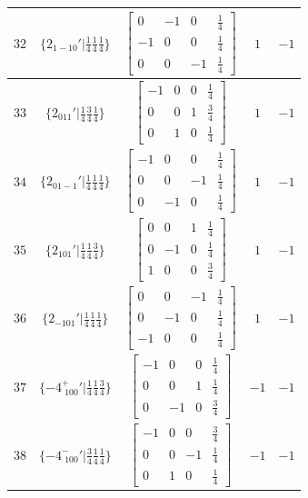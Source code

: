 \documentclass[fleqn,8pt]{jsarticle}
\begin{document}
\begin{longtable}{ccccc}
$ 32 $ & $ \{2{}_{1-10}{}'|\frac{1}{4} \frac{1}{4} \frac{1}{4}\} $ & $ \begin{bmatrix} 0 & -1 & 0 & \frac{1}{4} \\ -1 & 0 & 0 & \frac{1}{4} \\ 0 & 0 & -1 & \frac{1}{4} \end{bmatrix} $ & $ 1 $ & $ -1 $ \\ \hline
$ 33 $ & $ \{2{}_{011}{}'|\frac{1}{4} \frac{3}{4} \frac{1}{4}\} $ & $ \begin{bmatrix} -1 & 0 & 0 & \frac{1}{4} \\ 0 & 0 & 1 & \frac{3}{4} \\ 0 & 1 & 0 & \frac{1}{4} \end{bmatrix} $ & $ 1 $ & $ -1 $ \\ \hline
$ 34 $ & $ \{2{}_{01-1}{}'|\frac{1}{4} \frac{1}{4} \frac{1}{4}\} $ & $ \begin{bmatrix} -1 & 0 & 0 & \frac{1}{4} \\ 0 & 0 & -1 & \frac{1}{4} \\ 0 & -1 & 0 & \frac{1}{4} \end{bmatrix} $ & $ 1 $ & $ -1 $ \\ \hline
$ 35 $ & $ \{2{}_{101}{}'|\frac{1}{4} \frac{1}{4} \frac{3}{4}\} $ & $ \begin{bmatrix} 0 & 0 & 1 & \frac{1}{4} \\ 0 & -1 & 0 & \frac{1}{4} \\ 1 & 0 & 0 & \frac{3}{4} \end{bmatrix} $ & $ 1 $ & $ -1 $ \\ \hline
$ 36 $ & $ \{2{}_{-101}{}'|\frac{1}{4} \frac{1}{4} \frac{1}{4}\} $ & $ \begin{bmatrix} 0 & 0 & -1 & \frac{1}{4} \\ 0 & -1 & 0 & \frac{1}{4} \\ -1 & 0 & 0 & \frac{1}{4} \end{bmatrix} $ & $ 1 $ & $ -1 $ \\ \hline
$ 37 $ & $ \{-4^{+}_{\,\,100}{}'|\frac{1}{4} \frac{1}{4} \frac{3}{4}\} $ & $ \begin{bmatrix} -1 & 0 & 0 & \frac{1}{4} \\ 0 & 0 & 1 & \frac{1}{4} \\ 0 & -1 & 0 & \frac{3}{4} \end{bmatrix} $ & $ -1 $ & $ -1 $ \\ \hline
$ 38 $ & $ \{-4^{-}_{\,\,100}{}'|\frac{3}{4} \frac{1}{4} \frac{1}{4}\} $ & $ \begin{bmatrix} -1 & 0 & 0 & \frac{3}{4} \\ 0 & 0 & -1 & \frac{1}{4} \\ 0 & 1 & 0 & \frac{1}{4} \end{bmatrix} $ & $ -1 $ & $ -1 $ \\ \hline

\end{longtable}
\end{document}
